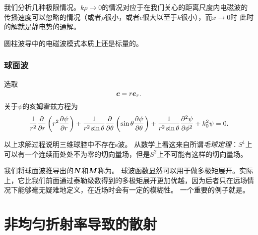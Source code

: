 我们分析几种极限情况。$k \rho \to 0$的情况对应于在我们关心的距离尺度内电磁波的传播速度可以忽略的情况（或者$\rho$很小，或者$c$很大以至于$k$很小），而$x \to 0$时 %
此时的解就是静电势的通解。

圆柱波导中的电磁波模式本质上还是标量的。

\subsection{球面波}

选取
\begin{equation}
    \vb*{c} = r \vb*{e}_r.
\end{equation}
关于$\psi$的亥姆霍兹方程为
\begin{equation}
    \frac{1}{r^2} \pdv{r}\left( r^2 \pdv{\psi}{r} \right) + \frac{1}{r^2 \sin \theta} \pdv{\theta} \left( \sin \theta \pdv{\psi}{\theta} \right) + \frac{1}{r^2 \sin \theta} \pdv[2]{\psi}{\phi} + k_0^2 \psi = 0.
\end{equation}

以上求解过程说明三维球腔中不存在s波。
从数学上看这来自所谓\emph{毛球定理}：$S^1$上可以有一个连续而处处不为零的切向量场，但是$S^2$上不可能有这样的切向量场。

我们将球面波推导出的$\vb*{N}$和$\vb*{M}$称为。
球波函数显然可以用于做多极矩展开。实际上，它比我们前面通过泰勒级数得到的多极矩展开更加优越，因为后者只在远场情况下能够毫无疑难地定义，在近场时会有一定的模糊性。
一个重要的例子就是。

\chapter{非均匀折射率导致的散射}